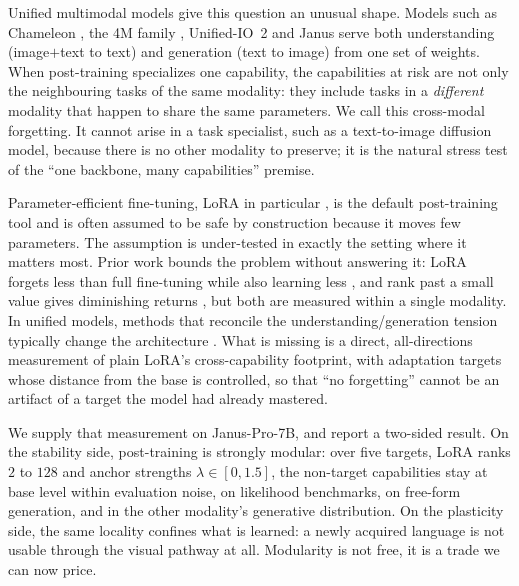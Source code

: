 \documentclass{article}
\begin{document}
Unified multimodal models give this question an unusual shape. Models such as
Chameleon \citep{chameleon2024}, the 4M family \citep{bachmann20244m21},
Unified-IO~2 \citep{lu2024unifiedio2} and Janus \citep{wu2024janus, januspro}
serve both understanding (image$+$text to text) and generation (text to image)
from one set of weights. When post-training specializes one capability, the
capabilities at risk are not only the neighbouring tasks of the same modality:
they include tasks in a \emph{different} modality that happen to share the same
parameters. We call this cross-modal forgetting. It cannot arise in a task
specialist, such as a text-to-image diffusion model, because there is no other
modality to preserve; it is the natural stress test of the ``one backbone, many
capabilities'' premise.

Parameter-efficient fine-tuning, LoRA in particular \citep{hu2022lora}, is the
default post-training tool and is often assumed to be safe by construction
because it moves few parameters. The assumption is under-tested in exactly the
setting where it matters most. Prior work bounds the problem without answering
it: LoRA forgets less than full fine-tuning while also learning less
\citep{biderman2024lora}, and rank past a small value gives diminishing returns
\citep{zhang2024scalingmeetsfinetuning}, but both are measured within a single
modality. In unified models, methods that reconcile the
understanding/generation tension typically change the architecture
\citep{dou2024loramoe}. What is missing is a direct, all-directions measurement
of plain LoRA's cross-capability footprint, with adaptation targets whose
distance from the base is controlled, so that ``no forgetting'' cannot be an
artifact of a target the model had already mastered.

We supply that measurement on Janus-Pro-7B, and report a two-sided result. On
the stability side, post-training is strongly modular: over five targets, LoRA
ranks $2$ to $128$ and anchor strengths $\lambda\in[0,1.5]$, the non-target
capabilities stay at base level within evaluation noise, on likelihood
benchmarks, on free-form generation, and in the other modality's generative
distribution. On the plasticity side, the same locality confines what is
learned: a newly acquired language is not usable through the visual pathway at
all. Modularity is not free, it is a trade we can now price.
\end{document}
